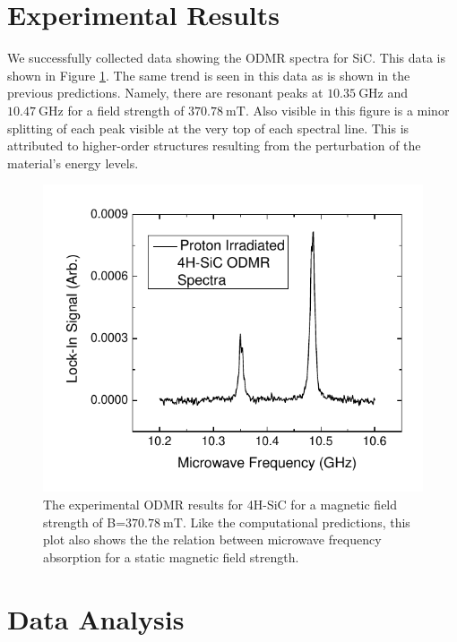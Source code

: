 \documentclass[oneside, noacknowlegments]{BYUPhys}
\begin{document}
\section{Experimental Results}

We successfully collected data showing the ODMR spectra for SiC. This data is shown in Figure \ref{fig:SiCResults}. The same trend is seen in this data as is shown in the previous predictions. Namely, there are resonant peaks at $10.35~\text{GHz}$ and $10.47~\text{GHz}$ for a field strength of $370.78~\text{mT}$. Also visible in this figure is a minor splitting of each peak visible at the very top of each spectral line. This is attributed to higher-order structures resulting from the perturbation of the material's energy levels.

\begin{figure}
    \centerline{\includegraphics{p14-odmr}}
    \caption[Experimental ODMR for SiC]{\label{fig:SiCResults}
     The experimental ODMR results for 4H-SiC for a magnetic field strength of B=$370.78~\text{mT}$. Like the computational predictions, this plot also shows the the relation between microwave frequency absorption for a static magnetic field strength.}
 \end{figure}
 
\section{Data Analysis}
\end{document}
